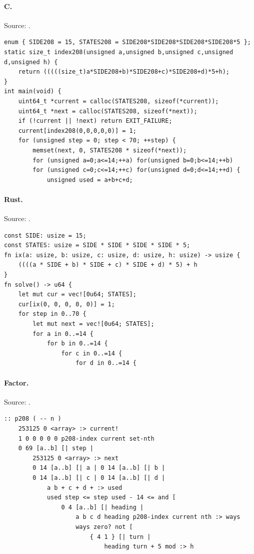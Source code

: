 \paragraph{C.} Source: .
\begin{lstlisting}
enum { SIDE208 = 15, STATES208 = SIDE208*SIDE208*SIDE208*SIDE208*5 };
static size_t index208(unsigned a,unsigned b,unsigned c,unsigned d,unsigned h) {
    return (((((size_t)a*SIDE208+b)*SIDE208+c)*SIDE208+d)*5+h);
}
int main(void) {
    uint64_t *current = calloc(STATES208, sizeof(*current));
    uint64_t *next = calloc(STATES208, sizeof(*next));
    if (!current || !next) return EXIT_FAILURE;
    current[index208(0,0,0,0,0)] = 1;
    for (unsigned step = 0; step < 70; ++step) {
        memset(next, 0, STATES208 * sizeof(*next));
        for (unsigned a=0;a<=14;++a) for(unsigned b=0;b<=14;++b)
        for (unsigned c=0;c<=14;++c) for(unsigned d=0;d<=14;++d) {
            unsigned used = a+b+c+d;
\end{lstlisting}

\paragraph{Rust.} Source: .
\begin{lstlisting}
const SIDE: usize = 15;
const STATES: usize = SIDE * SIDE * SIDE * SIDE * 5;
fn ix(a: usize, b: usize, c: usize, d: usize, h: usize) -> usize {
    ((((a * SIDE + b) * SIDE + c) * SIDE + d) * 5) + h
}
fn solve() -> u64 {
    let mut cur = vec![0u64; STATES];
    cur[ix(0, 0, 0, 0, 0)] = 1;
    for step in 0..70 {
        let mut next = vec![0u64; STATES];
        for a in 0..=14 {
            for b in 0..=14 {
                for c in 0..=14 {
                    for d in 0..=14 {
\end{lstlisting}

\paragraph{Factor.} Source: .
\begin{lstlisting}
:: p208 ( -- n )
    253125 0 <array> :> current!
    1 0 0 0 0 0 p208-index current set-nth
    0 69 [a..b] [| step |
        253125 0 <array> :> next
        0 14 [a..b] [| a | 0 14 [a..b] [| b |
        0 14 [a..b] [| c | 0 14 [a..b] [| d |
            a b + c + d + :> used
            used step <= step used - 14 <= and [
                0 4 [a..b] [| heading |
                    a b c d heading p208-index current nth :> ways
                    ways zero? not [
                        { 4 1 } [| turn |
                            heading turn + 5 mod :> h
\end{lstlisting}

